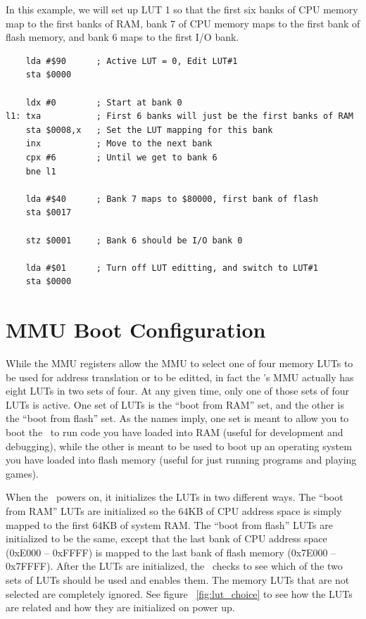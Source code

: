 In this example, we will set up LUT 1 so that the first six banks of CPU memory map to the first banks of RAM, bank 7 of CPU memory maps to the first bank of flash memory, and bank 6 maps to the first I/O bank.

\begin{verbatim}
    lda #$90      ; Active LUT = 0, Edit LUT#1
    sta $0000

    ldx #0        ; Start at bank 0
l1: txa           ; First 6 banks will just be the first banks of RAM
    sta $0008,x   ; Set the LUT mapping for this bank
    inx           ; Move to the next bank
    cpx #6        ; Until we get to bank 6
    bne l1

    lda #$40      ; Bank 7 maps to $80000, first bank of flash
    sta $0017

    stz $0001     ; Bank 6 should be I/O bank 0

    lda #$01      ; Turn off LUT editting, and switch to LUT#1
    sta $0000
\end{verbatim}

\section*{MMU Boot Configuration}

While the MMU registers allow the MMU to select one of four memory LUTs to be used for address translation or to be editted, in fact the \jr's MMU actually has eight LUTs in two sets of four. At any given time, only one of those sets of four LUTs is active. One set of LUTs is the ``boot from RAM'' set, and the other is the ``boot from flash'' set. As the names imply, one set is meant to allow you to boot the \jr\ to run code you have loaded into RAM (useful for development and debugging), while the other is meant to be used to boot up an operating system you have loaded into flash memory (useful for just running programs and playing games).

When the \jr\ powers on, it initializes the LUTs in two different ways. The ``boot from RAM'' LUTs are initialized so the 64KB of CPU address space is simply mapped to the first 64KB of system RAM. The ``boot from flash'' LUTs are initialized to be the same, except that the last bank of CPU address space (0xE000 -- 0xFFFF) is mapped to the last bank of flash memory (0x7E000 -- 0x7FFFF). After the LUTs are initialized, the \jr\ checks to see which of the two sets of LUTs should be used and enables them. The memory LUTs that are not selected are completely ignored. See figure ~\ref{fig:lut_choice} to see how the LUTs are related and how they are initialized on power up.

